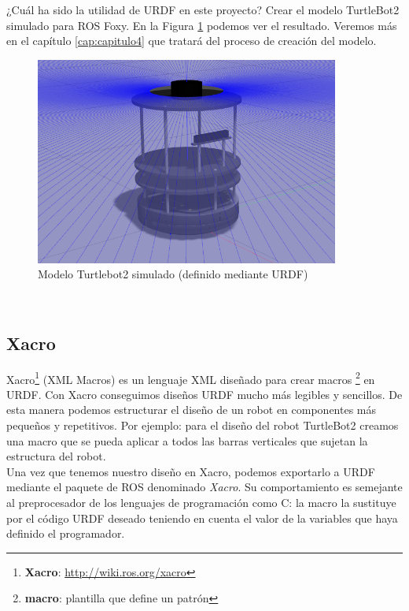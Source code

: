 ¿Cuál ha sido la utilidad de URDF en este proyecto? Crear el modelo TurtleBot2 simulado para ROS Foxy. En la Figura \ref{fig:modelo_turtlebot2_simulado} podemos ver el resultado. Veremos más en el capítulo \ref{cap:capitulo4} que tratará del proceso de creación del modelo.
\begin{figure} [H]
  \begin{center}
    \includegraphics[width=10cm]{imagenes/cap3/turtlebot2-sim.png}
  \end{center}
  \caption{Modelo Turtlebot2 simulado (definido mediante URDF)}
  \label{fig:modelo_turtlebot2_simulado}
\end{figure}\




\subsection{Xacro}
\label{subsec:xacro}

Xacro\footnote{\textbf{Xacro}: \url{http://wiki.ros.org/xacro}} (XML Macros) es un lenguaje XML diseñado para crear macros \footnote{\textbf{macro}: plantilla que define un patrón} en URDF. Con Xacro conseguimos diseños URDF mucho más legibles y sencillos. De esta manera podemos estructurar el diseño de un robot en componentes más pequeños y repetitivos. Por ejemplo: para el diseño del robot TurtleBot2 creamos una macro que se pueda aplicar a todos las barras verticales que sujetan la estructura del robot.\\

Una vez que tenemos nuestro diseño en Xacro, podemos exportarlo a URDF mediante el paquete de ROS denominado \textit{Xacro}. Su comportamiento es semejante al preprocesador de los lenguajes de programación como C: la macro la sustituye por el código URDF deseado teniendo en cuenta el valor de la variables que haya definido el programador.\\

